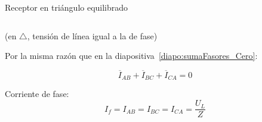 \documentclass[aspectratio=169, usenames,svgnames,dvipsnames]{beamer}
\begin{document}
\begin{frame}{Receptor en triángulo equilibrado}
\begin{columns}
\begin{column}{0.5\columnwidth}
        \begin{center}
            \small{(en $\triangle$, tensión de línea igual a la de fase)}
        \end{center}

        \vspace{1mm}
        
        \hspace*{-5mm}\small{Por la misma razón que en la diapositiva~\ref{diapo:sumaFasores_Cero}:}
        \normalsize

        \vspace{-3mm}
        \[
           \overline{I}_{AB}  + \overline{I}_{BC} + \overline{I}_{CA}  = 0 
        \]

        \vspace{1mm}
        Corriente de \alert{fase}:
        \[
          \boxed{I_f = {I}_{AB} = {I}_{BC} = {I}_{CA} = \frac{U_L}{Z}}
        \]
    \end{column}
    \end{columns}
\end{frame}

\end{document}
